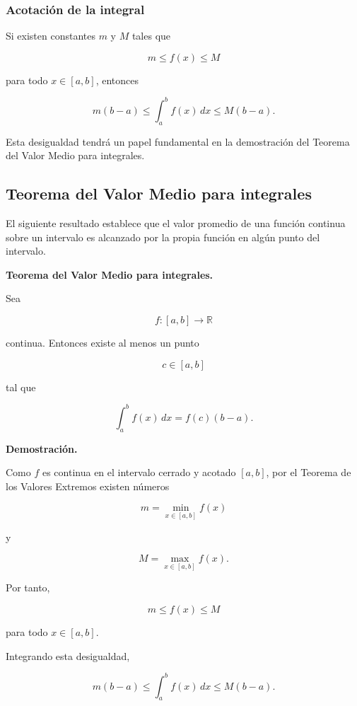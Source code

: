 \documentclass[12pt]{article}
\begin{document}

\subsubsection*{Acotación de la integral}

Si existen constantes $m$ y $M$ tales que

\[
m\leq f(x)\leq M
\]

para todo $x\in[a,b]$, entonces

\[
\boxed{
m(b-a)
\leq
\int_a^b f(x)\,dx
\leq
M(b-a).
}
\]

Esta desigualdad tendrá un papel fundamental en la demostración del
Teorema del Valor Medio para integrales.

\subsection{Teorema del Valor Medio para integrales}

El siguiente resultado establece que el valor promedio de una función
continua sobre un intervalo es alcanzado por la propia función en algún
punto del intervalo.

\textbf{Teorema del Valor Medio para integrales.}

Sea

\[
f:[a,b]\longrightarrow\mathbb{R}
\]

continua. Entonces existe al menos un punto

\[
c\in[a,b]
\]

tal que

\[
\boxed{
\int_a^b f(x)\,dx
=
f(c)(b-a).
}
\]

\textbf{Demostración.}

Como $f$ es continua en el intervalo cerrado y acotado $[a,b]$, por el
Teorema de los Valores Extremos existen números

\[
m=\min_{x\in[a,b]}f(x)
\]

y

\[
M=\max_{x\in[a,b]}f(x).
\]

Por tanto,

\[
m\leq f(x)\leq M
\]

para todo $x\in[a,b]$.

Integrando esta desigualdad,

\[
m(b-a)
\leq
\int_a^b f(x)\,dx
\leq
M(b-a).
\]
\end{document}
